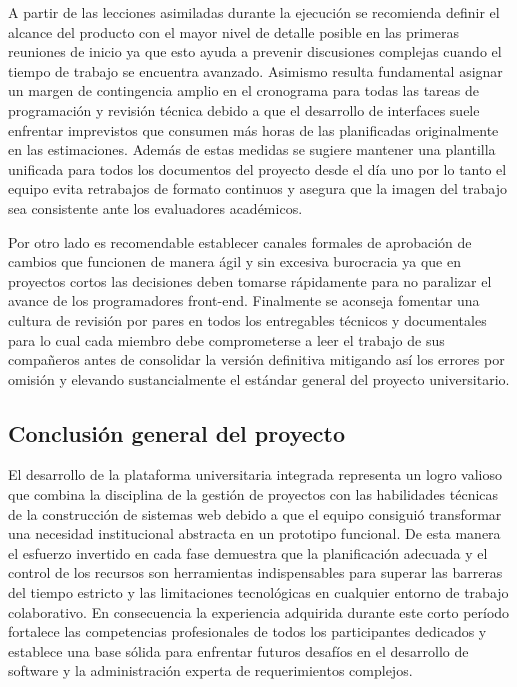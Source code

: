 \documentclass[11pt,spanish]{article}
\begin{document}
A partir de las lecciones asimiladas durante la ejecución se recomienda definir el alcance del producto con el mayor nivel de detalle posible en las primeras reuniones de inicio ya que esto ayuda a prevenir discusiones complejas cuando el tiempo de trabajo se encuentra avanzado. Asimismo resulta fundamental asignar un margen de contingencia amplio en el cronograma para todas las tareas de programación y revisión técnica debido a que el desarrollo de interfaces suele enfrentar imprevistos que consumen más horas de las planificadas originalmente en las estimaciones. Además de estas medidas se sugiere mantener una plantilla unificada para todos los documentos del proyecto desde el día uno por lo tanto el equipo evita retrabajos de formato continuos y asegura que la imagen del trabajo sea consistente ante los evaluadores académicos.

Por otro lado es recomendable establecer canales formales de aprobación de cambios que funcionen de manera ágil y sin excesiva burocracia ya que en proyectos cortos las decisiones deben tomarse rápidamente para no paralizar el avance de los programadores front-end. Finalmente se aconseja fomentar una cultura de revisión por pares en todos los entregables técnicos y documentales para lo cual cada miembro debe comprometerse a leer el trabajo de sus compañeros antes de consolidar la versión definitiva mitigando así los errores por omisión y elevando sustancialmente el estándar general del proyecto universitario.

\subsection{Conclusión general del proyecto}

El desarrollo de la plataforma universitaria integrada representa un logro valioso que combina la disciplina de la gestión de proyectos con las habilidades técnicas de la construcción de sistemas web debido a que el equipo consiguió transformar una necesidad institucional abstracta en un prototipo funcional. De esta manera el esfuerzo invertido en cada fase demuestra que la planificación adecuada y el control de los recursos son herramientas indispensables para superar las barreras del tiempo estricto y las limitaciones tecnológicas en cualquier entorno de trabajo colaborativo. En consecuencia la experiencia adquirida durante este corto período fortalece las competencias profesionales de todos los participantes dedicados y establece una base sólida para enfrentar futuros desafíos en el desarrollo de software y la administración experta de requerimientos complejos.
\end{document}
